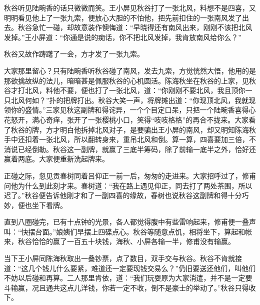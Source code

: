 \documentclass[12pt,UTF8]{ctexbook}
\begin{document}
{{{秋谷听见陆畹香的话只微微而笑。王小屏见秋谷打了一张北风，料想不是四喜，又明明看见他上了一张九索，便放心大胆的不怕他，把先前扣住的一张南风发了出去。秋谷急忙一碰，却故意装作懊悔道：“早晓得还有南风出来，刚刚不该把北风发掉。”王小屏道：“你通是说的痴话，你不把北风发掉，我肯放南风给你么？”

秋谷又故作踌躇了一会，方才发了一张九索。

大家那里留心？只有陆畹香听秋谷碰了南风，发去九索，方觉恍然大悟，他用的是那欲擒故纵的法儿，暗暗甚是佩服秋谷的心机圆活。陈海秋坐在秋谷的上家，见秋谷才打北风，料他不要，便也打了一张北风，道：“你刚刚不要北风，我且顶你一只北风何如？”扑的把牌打出。秋谷大笑一声，将牌摊出道：“你现顶北风，我就现领你的盛情。”三家见秋这副牌和得诧异，一个个目定口呆，只把一个陆畹香喜得心花怒开，满心奇痒，张开了一张樱桃小口，笑得“吱吱格格”的再合不拢来。大家看了秋谷的牌，方才明白他拆掉北风对子，是要骗出王小屏的南风，却又明知陈海秋手中还扣着一张北风，所以翻转身来，重吊北风和倒。算一算，四喜要加三倍，不消说已经倒勒。秋谷这一副牌，就赢了三底半筹码，除了前输一底半之外，恰好还赢着两底。大家便重新洗起牌来。

正碰之际，忽见贡春树同着吕仰正一前一后，匆匆的走进来。大家招呼过了，修甫问他为什么到此刻才来。春树道：“我在路上遇见仰正，同去打了两处茶围，所以迟了。”秋谷便告诉他刚才和了一副四喜的缘故，春树也说秋谷这副牌和得十分巧妙，便也坐下看牌。

直到八圈碰完，已有十点钟的光景，各人都觉得腹中有些雷响起来，修甫便一叠声叫：“快摆台面。”娘姨们早摆上四碟点心。秋谷等随意点饥，相将坐下，算起和帐来，秋谷恰恰的赢了一百五十块钱，海秋、小屏各输一半，修甫没有输赢。

当下王小屏同陈海秋取出一叠钞票，点了数目，双手交与秋谷。秋谷不肯就接道：“这几个钱儿什么要紧，难道还一定要现钱交易么？”仍旧要送还他们，叫他们不妨以后碰和再算。二人那里肯依，道：“我们玩耍原为大家消遣，并不是一定要斗输赢，况且通共这点儿洋钱，你若一定不收，倒不是豪士的举动了。”秋谷只得收下。

}}}
\end{document}
